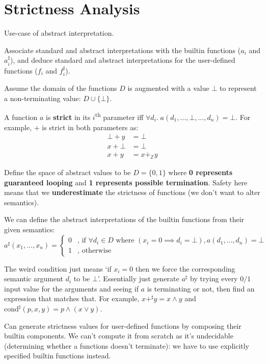 \documentclass[a4paper, 11pt]{article}
\begin{document}
\section*{Strictness Analysis}
{
    Use-case of abstract interpretation.

    Associate standard and abstract interpretations with the builtin functions (\(a_i\) and \(a^\sharp_i\)), and deduce standard and abstract interpretations for the user-defined functions (\(f_i\) and \(f^\sharp_i\)).

    Assume the domain of the functions \(D\) is augmented with a value \(\bot\) to represent a non-terminating value: \(D \cup \{\bot\}\).

    A function \(a\) is \textbf{strict} in its \(i\)\textsuperscript{th} parameter iff \(\forall d_i.\; a(d_1, \dots, \bot, \dots, d_n) = \bot\). For example, \(+\) is strict in both parameters as:
    \begin{align*}
    \bot + y &= \bot \\
    x + \bot &= \bot \\
    x + y    &= x +_\mathbb{Z} y
    \end{align*}

    Define the space of abstract values to be \(D = \{0, 1\}\) where \textbf{0 represents guaranteed looping} and \textbf{1 represents possible termination}. Safety here means that we \textbf{underestimate} the strictness of functions (we don't want to alter semantics).

    We can define the abstract interpretations of the builtin functions from their given semantics:
    \begin{equation*}
    a^\sharp(x_1, ..., x_n) = \begin{cases}
        0 & \text{, if }\forall d_i \in D \text{ where }(x_i = 0 \implies d_i = \bot), a(d_1, ..., d_n) = \bot \\
        1 & \text{, otherwise}
    \end{cases}
    \end{equation*}

    The weird condition just means `if \(x_i = 0\) then we force the corresponding semantic argument \(d_i\) to be \(\bot\)'. Essentially just generate \(a^\sharp\) by trying every \(0/1\) input value for the arguments and seeing if \(a\) is terminating or not, then find an expression that matches that. For example, \(x +^\sharp y = x \wedge y\) and \(\text{cond}^\sharp(p, x, y) = p \wedge (x \vee y)\).

    Can generate strictness values for user-defined functions by composing their builtin components. We can't compute it from scratch as it's undecidable (determining whether a functions doesn't terminate): we have to use explicitly specified builtin functions instead.

}
\end{document}
